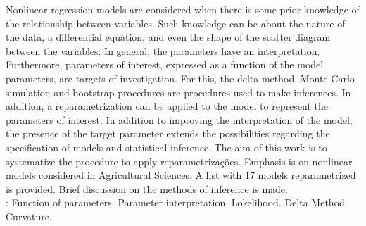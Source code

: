 Nonlinear regression models are considered when there is some prior
knowledge of the relationship between variables. Such knowledge can be
about the nature of the data, a differential equation, and even the
shape of the scatter diagram between the variables. In general, the
parameters have an interpretation. Furthermore, parameters of
interest, expressed as a function of the model parameters, are targets
of investigation. For this, the delta method, Monte Carlo simulation
and bootstrap procedures are procedures used to make inferences. In
addition, a reparametrization can be applied to the model to represent
the parameters of interest. In addition to improving the
interpretation of the model, the presence of the target parameter
extends the possibilities regarding the specification of models and
statistical inference. The aim of this work is to systematize the
procedure to apply reparametrizações.  Emphasis is on nonlinear models
considered in Agricultural Sciences.  A list with 17 models
reparametrized is provided. Brief discussion on the methods of
inference is made.\\
\newline
{}: Function of parameters. Parameter 
interpretation. Lokelihood. Delta Method. Curvature.
